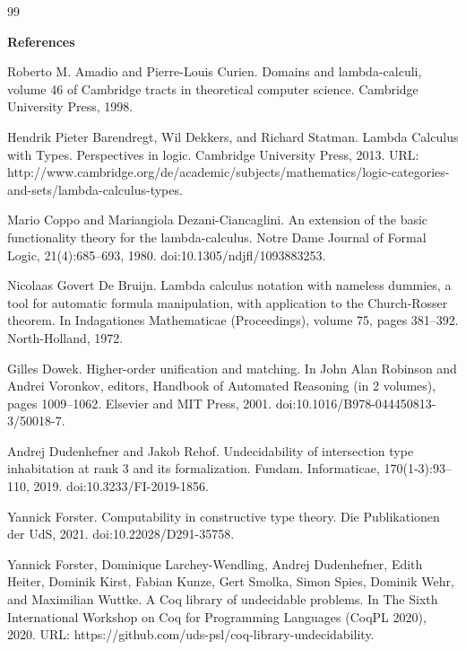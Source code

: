 \documentclass[10pt,a4paper]{amsart}
\begin{document}
\begin{thebibliography}{99}

 
\par\medskip\noindent\textbf{References}\par
  
\par\noindent  [1]  Roberto M. Amadio and Pierre-Louis Curien.  Domains and lambda-calculi, volume 46 of Cambridge tracts in theoretical computer science.  Cambridge University Press, 1998.  
 
\par\noindent  [2]  Hendrik Pieter Barendregt, Wil Dekkers, and Richard Statman.  Lambda Calculus with Types.  Perspectives in logic. Cambridge University Press, 2013.  URL: http://www.cambridge.org/de/academic/subjects/mathematics/logic-categories-and-sets/lambda-calculus-types.  
 
\par\noindent  [3]  Mario Coppo and Mariangiola Dezani-Ciancaglini.  An extension of the basic functionality theory for the lambda-calculus.  Notre Dame Journal of Formal Logic, 21(4):685–693, 1980.  doi:10.1305/ndjfl/1093883253.  
 
\par\noindent  [4]  Nicolaas Govert De Bruijn.  Lambda calculus notation with nameless dummies, a tool for automatic formula manipulation, with application to the Church-Rosser theorem.  In Indagationes Mathematicae (Proceedings), volume 75, pages 381–392. North-Holland, 1972.  
 
\par\noindent  [5]  Gilles Dowek.  Higher-order unification and matching.  In John Alan Robinson and Andrei Voronkov, editors, Handbook of Automated Reasoning (in 2 volumes), pages 1009–1062. Elsevier and MIT Press, 2001.  doi:10.1016/B978-044450813-3/50018-7.  
 
\par\noindent  [6]  Andrej Dudenhefner and Jakob Rehof.  Undecidability of intersection type inhabitation at rank 3 and its formalization.  Fundam. Informaticae, 170(1-3):93–110, 2019.  doi:10.3233/FI-2019-1856.  
 
\par\noindent  [7]  Yannick Forster.  Computability in constructive type theory.  Die Publikationen der UdS, 2021.  doi:10.22028/D291-35758.  
 
\par\noindent  [8]  Yannick Forster, Dominique Larchey-Wendling, Andrej Dudenhefner, Edith Heiter, Dominik Kirst, Fabian Kunze, Gert Smolka, Simon Spies, Dominik Wehr, and Maximilian Wuttke.  A Coq library of undecidable problems.  In The Sixth International Workshop on Coq for Programming Languages (CoqPL 2020), 2020.  URL: https://github.com/uds-psl/coq-library-undecidability.  
 

\end{thebibliography}
\end{document}
